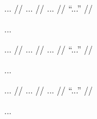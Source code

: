 \documentclass[12pt,paper=a4]{scrartcl}
\begin{document}

\ex \begingl
	\glpreamble ... //
	\gla ... //
	\glb ... //
	\glft \enquote{...} //
\endgl \xe

...


\ex \begingl
	\glpreamble ... //
	\gla ... //
	\glb ... //
	\glft \enquote{...} //
\endgl \xe

...


\ex \begingl
	\glpreamble ... //
	\gla ... //
	\glb ... //
	\glft \enquote{...} //
\endgl \xe

...


\printbibliography
\end{document}
